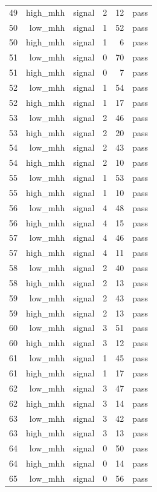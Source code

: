 \begin{table}[htbp]
{\begin{tabular}{lrrrrr}
49 & high\_mhh & signal & 2 & 12 & pass \\
50 & low\_mhh & signal & 1 & 52 & pass \\
50 & high\_mhh & signal & 1 & 6 & pass \\
51 & low\_mhh & signal & 0 & 70 & pass \\
51 & high\_mhh & signal & 0 & 7 & pass \\
52 & low\_mhh & signal & 1 & 54 & pass \\
52 & high\_mhh & signal & 1 & 17 & pass \\
53 & low\_mhh & signal & 2 & 46 & pass \\
53 & high\_mhh & signal & 2 & 20 & pass \\
54 & low\_mhh & signal & 2 & 43 & pass \\
54 & high\_mhh & signal & 2 & 10 & pass \\
55 & low\_mhh & signal & 1 & 53 & pass \\
55 & high\_mhh & signal & 1 & 10 & pass \\
56 & low\_mhh & signal & 4 & 48 & pass \\
56 & high\_mhh & signal & 4 & 15 & pass \\
57 & low\_mhh & signal & 4 & 46 & pass \\
57 & high\_mhh & signal & 4 & 11 & pass \\
58 & low\_mhh & signal & 2 & 40 & pass \\
58 & high\_mhh & signal & 2 & 13 & pass \\
59 & low\_mhh & signal & 2 & 43 & pass \\
59 & high\_mhh & signal & 2 & 13 & pass \\
60 & low\_mhh & signal & 3 & 51 & pass \\
60 & high\_mhh & signal & 3 & 12 & pass \\
61 & low\_mhh & signal & 1 & 45 & pass \\
61 & high\_mhh & signal & 1 & 17 & pass \\
62 & low\_mhh & signal & 3 & 47 & pass \\
62 & high\_mhh & signal & 3 & 14 & pass \\
63 & low\_mhh & signal & 3 & 42 & pass \\
63 & high\_mhh & signal & 3 & 13 & pass \\
64 & low\_mhh & signal & 0 & 50 & pass \\
64 & high\_mhh & signal & 0 & 14 & pass \\
65 & low\_mhh & signal & 0 & 56 & pass \\

\end{tabular}}
\end{table}
